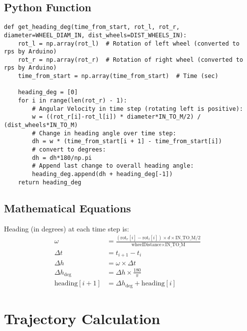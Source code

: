 \documentclass{article}
\begin{document}
\subsection{Python Function}
\begin{lstlisting}
def get_heading_deg(time_from_start, rot_l, rot_r, diameter=WHEEL_DIAM_IN, dist_wheels=DIST_WHEELS_IN):
    rot_l = np.array(rot_l)  # Rotation of left wheel (converted to rps by Arduino)
    rot_r = np.array(rot_r)  # Rotation of right wheel (converted to rps by Arduino)
    time_from_start = np.array(time_from_start)  # Time (sec)

    heading_deg = [0]
    for i in range(len(rot_r) - 1):
        # Angular Velocity in time step (rotating left is positive):
        w = ((rot_r[i]-rot_l[i]) * diameter*IN_TO_M/2) / (dist_wheels*IN_TO_M)
        # Change in heading angle over time step:
        dh = w * (time_from_start[i + 1] - time_from_start[i])
        # convert to degrees:
        dh = dh*180/np.pi
        # Append last change to overall heading angle:
        heading_deg.append(dh + heading_deg[-1])
    return heading_deg
\end{lstlisting}

\subsection{Mathematical Equations}
Heading (in degrees) at each time step is:
\begin{align*}
\omega &= \frac{(\text{rot}_r[i] - \text{rot}_l[i]) \times d \times \text{IN\_TO\_M} / 2}{\text{wheelDistance} \times \text{IN\_TO\_M}} \\
\Delta t &= t_{i+1} - t_i \\
\Delta h &= \omega \times \Delta t \\
\Delta h_{\text{deg}} &= \Delta h \times \frac{180}{\pi} \\
\text{heading}[i+1] &= \Delta h_{\text{deg}} + \text{heading}[i]
\end{align*}

\section{Trajectory Calculation}
\end{document}
